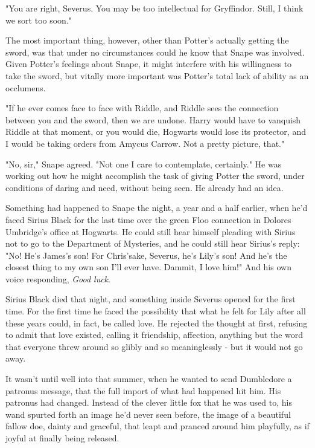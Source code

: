 "You are right, Severus. You may be too intellectual for Gryffindor. Still, I think we sort too soon."

The most important thing, however, other than Potter's actually getting the sword, was that under no circumstances could he know that Snape was involved. Given Potter's feelings about Snape, it might interfere with his willingness to take the sword, but vitally more important was Potter's total lack of ability as an occlumens.

"If he ever comes face to face with Riddle, and Riddle sees the connection between you and the sword, then we are undone. Harry would have to vanquish Riddle at that moment, or you would die, Hogwarts would lose its protector, and I would be taking orders from Amycus Carrow. Not a pretty picture, that."

"No, sir," Snape agreed. "Not one I care to contemplate, certainly." He was working out how he might accomplish the task of giving Potter the sword, under conditions of daring and need, without being seen. He already had an idea.

Something had happened to Snape the night, a year and a half earlier, when he'd faced Sirius Black for the last time over the green Floo connection in Dolores Umbridge's office at Hogwarts. He could still hear himself pleading with Sirius not to go to the Department of Mysteries, and he could still hear Sirius's reply: "No! He's James's son! For Chris'sake, Severus, he's Lily's son! And he's the closest thing to my own son I'll ever have. Dammit, I love him!" And his own voice responding, \emph{Good luck}.

Sirius Black died that night, and something inside Severus opened for the first time. For the first time he faced the possibility that what he felt for Lily after all these years could, in fact, be called love. He rejected the thought at first, refusing to admit that love existed, calling it friendship, affection, anything but the word that everyone threw around so glibly and so meaninglessly - but it would not go away.

It wasn't until well into that summer, when he wanted to send Dumbledore a patronus message, that the full import of what had happened hit him. His patronus had changed. Instead of the clever little fox that he was used to, his wand spurted forth an image he'd never seen before, the image of a beautiful fallow doe, dainty and graceful, that leapt and pranced around him playfully, as if joyful at finally being released.

